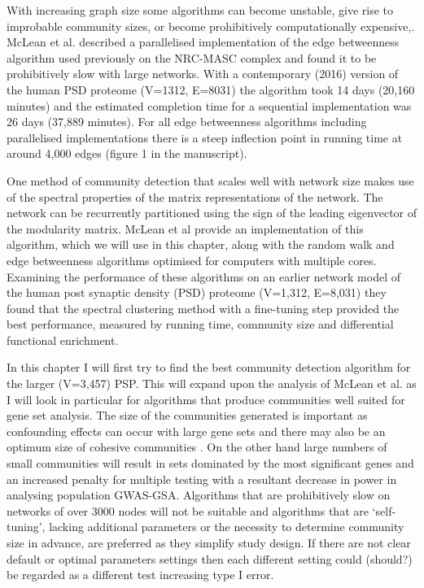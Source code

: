  With increasing graph size some algorithms can become unstable, give rise to improbable community sizes, or become prohibitively computationally expensive\cite{pocklington2006proteomes},\cite{mclean2016improved}. 
McLean et al.\cite{mclean2016improved} described a parallelised implementation of the edge betweenness algorithm used previously on the NRC-MASC complex\cite{pocklington2006organization} and found it to be prohibitively slow with large networks. With a contemporary (2016) version of the human PSD proteome (V=1312, E=8031) the algorithm took 14 days (20,160 minutes) and the estimated completion time for a sequential implementation was 26 days (37,889 minutes). For all edge betweenness algorithms including parallelised implementations there is a steep inflection point in running time at around 4,000 edges (figure 1 in the manuscript\cite{mclean2016improved}).

One method of community detection that scales well with network size makes use of the spectral properties of the matrix representations of the network\cite{newman2013spectral}.  The network can be recurrently partitioned using the sign of the leading eigenvector of the modularity matrix\cite{newman2013spectral}.  McLean et al \cite{mclean2016improved} provide an implementation of this algorithm, which we will use in this chapter, along with the random walk and edge betweenness algorithms optimised for computers with multiple cores. Examining the performance of these algorithms on an earlier network model of the human post synaptic density (PSD) proteome (V=1,312, E=8,031) they found that the spectral clustering method with a fine-tuning step provided the best performance, measured by running time, community size and differential functional enrichment. 

In this chapter I will first try to find the best community detection algorithm for the larger (V=3,457) PSP. This will expand upon the analysis of McLean\cite{mclean2016improved} et al. as I will look in particular for algorithms that produce communities well suited for gene set analysis. The size of the communities generated is important as confounding effects can occur with large gene sets\cite{de2016statistical} and there may also be an optimum size of cohesive communities \cite{leskovec2009community}. On the other hand large numbers of small communities will result in sets dominated by the most significant genes and an increased penalty for multiple testing with a resultant decrease in power in analysing population GWAS-GSA. Algorithms that are prohibitively slow on networks of over 3000 nodes will not be suitable and algorithms that are `self-tuning', lacking additional parameters or the necessity to determine community size in advance, are preferred as they simplify study design. If there are not clear default or optimal parameters settings then each different setting could (should?) be regarded as a different test increasing type I error. 

